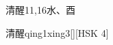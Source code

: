 \begin{entry}{清醒}{11,16}{⽔、⾣}
  \begin{phonetics}{清醒}{qing1xing3}[][HSK 4]
  \end{phonetics}
\end{entry}
